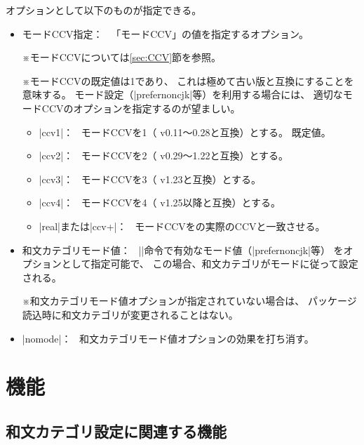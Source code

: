 \documentclass[uplatex,dvipdfmx,a4paper]{jsarticle}
\newenvironment{myverbatim}
  {\quote\small\verbatim}
  {\endverbatim\endquote}
\newcommand{\Note}{\par\noindent ※}
\newcommand{\Means}{：~}
\newcommand{\strong}{\textsf}
\begin{document}
\begin{myverbatim}
\usepackage[<オプション>]{pxcjkcat}
\end{myverbatim}

オプションとして以下のものが指定できる。

\begin{itemize}
\item \strong{モードCCV指定}\Means
  \<「モードCCV」の値を指定するオプション。
  \Note モードCCVについては\ref{sec:CCV}節を参照。
  \Note モードCCVの既定値は1であり、
  これは極めて古い版と互換にすることを意味する。
  モード設定（|prefernoncjk|等）を利用する場合には、
  適切なモードCCVのオプションを指定するのが望ましい。
  \begin{itemize}
  \item |ccv1|\Means
    モードCCVを1（{\upTeX} v0.11～0.28と互換）とする。
    \strong{既定値。}
  \item |ccv2|\Means
    モードCCVを2（{\upTeX} v0.29～1.22と互換）とする。
  \item |ccv3|\Means
    モードCCVを3（{\upTeX} v1.23と互換）とする。
  \item |ccv4|\Means
    モードCCVを4（{\upTeX} v1.25以降と互換）とする。
  \item |real|または|ccv+|\Means
    モードCCVを{\upTeX}の実際のCCVと一致させる。
  \end{itemize}
\item \strong{和文カテゴリモード値}\Means
  |\cjkcategorymode|命令で有効なモード値（|prefernoncjk|等）
  をオプションとして指定可能で、
  この場合、和文カテゴリがモードに従って設定される。
  \Note 和文カテゴリモード値オプションが指定されていない場合は、
  パッケージ読込時に和文カテゴリが変更されることはない。
\item |nomode|\Means
  和文カテゴリモード値オプションの効果を打ち消す。
\end{itemize}

\section{機能}
\label{sec:Function}

\subsection{和文カテゴリ設定に関連する機能}
\label{ssec:cjkcategory-function}
\end{document}
